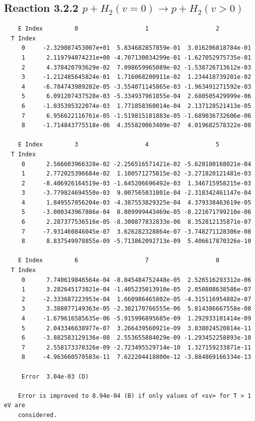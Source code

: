 \documentclass[12pt,dvipdfmx]{article}
\begin{document}
\newpage
\subsection{
Reaction 3.2.2 $   p + H_2(v=0) \rightarrow p + H_2(v > 0)$}


\begin{small}\begin{verbatim}
    E Index         0                   1                   2
  T Index
     0     -2.329087453007e+01  5.834682857859e-01  3.016206818784e-01
     1      2.119794074231e+00 -4.707130034299e-01 -1.627052975735e-01
     2      4.378420793629e-02  7.098659965089e-02 -1.538726713612e-03
     3     -1.212485645824e-01  1.716068200911e-02  1.234418739201e-02
     4     -6.784743989202e-05 -3.554071145865e-03 -1.963491271592e-03
     5      6.091207437528e-03 -5.334937961855e-04  2.680505429999e-06
     6     -1.035395322074e-03  1.771858360014e-04  2.137128521413e-05
     7      6.956622116761e-05 -1.519815181883e-05 -1.689036732606e-06
     8     -1.714843775518e-06  4.355820063409e-07  4.019682578322e-08

    E Index         3                   4                   5
  T Index
     0      2.566603966328e-02 -2.256516571421e-02 -5.628180168021e-04
     1      2.772025396684e-02  1.100571275815e-02 -3.271820121481e-03
     2     -8.406926164519e-03 -1.645206696492e-03  1.346715958215e-03
     3     -3.779824694550e-03  9.007565031801e-04 -2.318342461147e-04
     4      1.849557056204e-03 -4.387553829325e-04  4.379338463619e-05
     5     -3.000343967886e-04  8.809999443469e-05 -8.221671799210e-06
     6      2.287377536516e-05 -8.300877832833e-06  8.352812135871e-07
     7     -7.931460846045e-07  3.626282328864e-07 -3.748271128306e-08
     8      8.837549978855e-09 -5.713862092713e-09  5.406617870326e-10

    E Index         6                   7                   8
  T Index
     0      7.740619846564e-04 -8.045484752448e-05  2.526516293312e-06
     1      3.282645173821e-04 -1.405235013910e-05  2.050808638586e-07
     2     -2.333687223953e-04  1.660986465802e-05 -4.315116954882e-07
     3      3.388077149363e-05 -2.302170766555e-06  5.814386667558e-08
     4     -1.679616585635e-06 -5.915996895685e-09  1.292933101414e-09
     5      2.043346638977e-07  3.266439560921e-09  3.038024520814e-11
     6     -3.882583129136e-08  2.553655884029e-09 -1.293452258893e-10
     7      2.558173370326e-09 -2.723495529714e-10  1.327159233871e-11
     8     -4.963660570583e-11  7.622204418800e-12 -3.884869166334e-13

     Error  3.04e-03 (D)

    Error is improved to 8.94e-04 (B) if only values of <sv> for T > 1 eV are
    considered.
\end{verbatim}\end{small}
\end{document}
